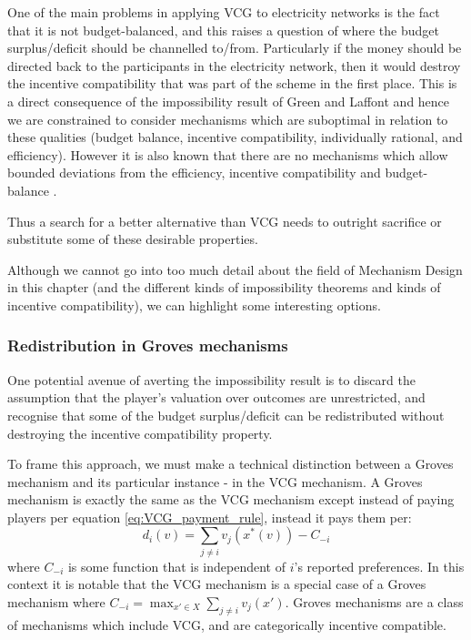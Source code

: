 One of the main problems in applying VCG to electricity networks is the fact that it is not budget-balanced, and this raises a question of where the budget surplus/deficit should be channelled to/from.
Particularly if the money should be directed back to the participants in the electricity network, then it would destroy the incentive compatibility that was part of the scheme in the first place.
This is a direct consequence of the impossibility result of Green and Laffont \cite{29088} and hence we are constrained to consider mechanisms which are suboptimal in relation to these qualities (budget balance, incentive compatibility, individually rational, and efficiency).
However it is also known that there are no mechanisms which allow bounded deviations from the efficiency, incentive compatibility and budget-balance \cite{YI201679}.

Thus a search for a better alternative than VCG needs to outright sacrifice or substitute some of these desirable properties.

Although we cannot go into too much detail about the field of Mechanism Design in this chapter (and the different kinds of impossibility theorems and kinds of incentive compatibility), we can highlight some interesting options.

\subsubsection*{Redistribution in Groves mechanisms}

One potential avenue of averting the impossibility result is to discard the assumption that the player's valuation over outcomes are unrestricted, and recognise that some of the budget surplus/deficit can be redistributed without destroying the incentive compatibility property.

To frame this approach, we must make a technical distinction between a Groves mechanism and its particular instance - in the VCG mechanism.
A Groves mechanism is exactly the same as the VCG mechanism except instead of paying players per equation \ref{eq:VCG_payment_rule}, instead it pays them per:
\begin{equation}\label{eq:Groves_payment_equation} d_i(v)=\sum_{j\ne i}v_j(x^*(v)) - C_{-i} \end{equation}
where $C_{-i}$ is some function that is independent of $i$'s reported preferences.
In this context it is notable that the VCG mechanism is a special case of a Groves mechanism where $C_{-i}= \max_{x'\in X}\sum_{j\ne i}v_j(x')$. \cite{10.2307/1914085}
Groves mechanisms are a class of mechanisms which include VCG, and are categorically incentive compatible. 

